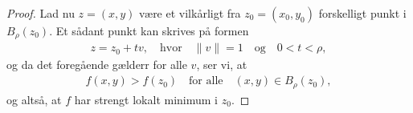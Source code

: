 \begin{proof}
  Lad nu $z = (x,y)$ være et vilkårligt fra $z_0 = (x_0, y_0)$ forskelligt punkt i $B_\rho(z_0)$. Et sådant punkt kan skrives på formen
  \begin{align*}
    z = z_0 + tv, \quad \text{hvor} \quad \| v \| = 1 \quad \text{og} \quad 0 < t < \rho,
  \end{align*}
  og da det foregående gælderr for alle $v$, ser vi, at
  \begin{align*}
    f(x,y) > f(z_0) \quad \text{for alle} \quad (x,y) \in B_\rho(z_0),
  \end{align*}
  og altså, at $f$ har strengt lokalt minimum i $z_0$.
\end{proof}
